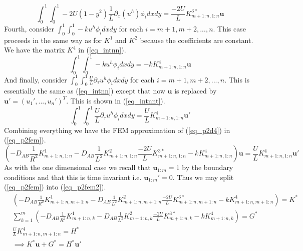 \documentclass[11pt,fleqn]{article}
\theoremstyle{defstyle}
\begin{document}
\begin{equation}
\int_0^1 \int_0^1 - 2U(1-y^2)\frac{1}{L}\partial_x(u^h)  \phi_idxdy  = \frac{-2U}{L} K^{3*}_{m+1:n,1:n}\mathbf{u}
\label{eq_intdx3}
\end{equation}
Fourth, consider $\int_0^1 \int_0^1  - ku^h \phi_i dxdy$ for each $i=m+1, m+2,...,n$. This case proceeds in the same way as for $K^1$ and $K^2$ because the coefficients are constant. We have the matrix $K^4$ in (\ref{eq_intnn}).
\begin{equation}
\int_0^1 \int_0^1 - ku^h \phi_i dxdy = -kK^4_{m+1:n, 1:n}\mathbf{u}
\label{eq_intnn}
\end{equation}
And finally, consider $\int_0^1 \int_0^1 \frac{U}{L} \partial_\tau u^h \phi_i dxdy$ for each $i=m+1, m+2,...,n$. This is essentially the same as (\ref{eq_intnn}) except that now $\mathbf{u}$ is replaced by $\mathbf{u} \prime = \left( u_1 \prime,...,u_n \prime\right)^T$. This is shown in (\ref{eq_intnnt}).
\begin{equation}
\int_0^1 \int_0^1 \frac{U}{L} \partial_\tau u^h \phi_i dxdy = \frac{U}{L} K^4_{m+1:n, 1:n}\mathbf{u}\prime
\label{eq_intnnt}
\end{equation}
Combining everything we have the FEM approximation of (\ref{eq_p2d4}) in (\ref{eq_p2fem}).
\begin{equation}
\left( -D_{AB}\frac{1}{R^2}K^1_{m+1:n, 1:n} -D_{AB}\frac{1}{L^2}K^2_{m+1:n, 1:n} \frac{-2U}{L} K^{3*}_{m+1:n,1:n} -kK^4_{m+1:n, 1:n} \right)\mathbf{u} =\frac{U}{L} K^4_{m+1:n, 1:n}\mathbf{u}\prime
\label{eq_p2fem}
\end{equation}
As with the one dimensional case we recall that $\mathbf{u}_{1:m}=1$ by the boundary conditions and that this is time invariant i.e. $\mathbf{u}_{1:m}\prime=0$. Thus we may split (\ref{eq_p2fem}) into (\ref{eq_p2fem2}).
\begin{equation}
\begin{aligned}
&\left( -D_{AB}\frac{1}{R^2}K^1_{m+1:n, m+1:n} -D_{AB}\frac{1}{L^2}K^2_{m+1:n, m+1:n} \frac{-2U}{L} K^{3*}_{m+1:n,m+1:n} -kK^4_{m+1:n, m+1:n} \right) = K^* \\
&\sum_{k=1}^m \left(-D_{AB}\frac{1}{R^2}K^1_{m+1:n, k} -D_{AB}\frac{1}{L^2}K^2_{m+1:n, k} \frac{-2U}{L} K^{3*}_{m+1:n,k} -kK^4_{m+1:n,k} \right) = G^* \\
&\frac{U}{L} K^4_{m+1:n, m+1:n} = H^* \\
&\implies K^*\mathbf{u} + G^* = H^*\mathbf{u}\prime
\end{aligned}
\label{eq_p2fem2}
\end{equation}
\end{document}
